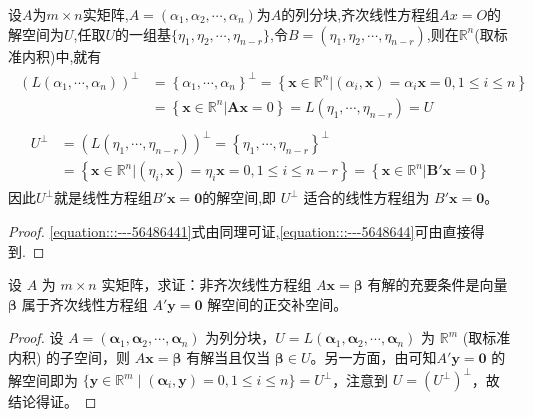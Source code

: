 \documentclass[../../main.tex]{subfiles}
\begin{document}
\begin{corollary}\label{corollary:齐次方程的解空间是其系数矩阵的正交补空间}
设$A$为$m\times n$实矩阵,$A=(\alpha_1,\alpha_2,\cdots,\alpha_n)$为$A$的列分块,齐次线性方程组$Ax=O$的解空间为$U$,任取$U$的一组基$\{\eta_1,\eta_2,\cdots,\eta_{n-r}\}$,令$B=(\eta_1,\eta_2,\cdots,\eta_{n-r})$,则在$\mathbb{R}^n$(取标准内积)中,就有
\begin{align}\label{equation:::---56486441}
\begin{aligned}
\left( L\left( \alpha _1,\cdots ,\alpha _n \right) \right) ^{\bot}&=\left\{ \alpha _1,\cdots ,\alpha _n \right\} ^{\bot}=\left\{ \boldsymbol{x}\in \mathbb{R} ^n|\left( \alpha _i,\boldsymbol{x} \right) =\alpha _i\boldsymbol{x}=0,1\le i\le n \right\} 
\\
&=\left\{ \boldsymbol{x}\in \mathbb{R} ^n|\boldsymbol{Ax}=0 \right\} =L\left( \eta _1,\cdots ,\eta _{n-r} \right) =U
\end{aligned}
\end{align}
\begin{align}\label{equation:::---5648644}
\begin{aligned}
U^{\bot}&=\left( L\left( \eta _1,\cdots ,\eta _{n-r} \right) \right) ^{\bot}=\left\{ \eta _1,\cdots ,\eta _{n-r} \right\} ^{\bot}
\\
&=\left\{ \boldsymbol{x}\in \mathbb{R} ^n|\left( \eta _i,\boldsymbol{x} \right) =\eta _i\boldsymbol{x}=0,1\le i\le n-r \right\} =\left\{ \boldsymbol{x}\in \mathbb{R} ^n|\boldsymbol{B}'\boldsymbol{x}=0 \right\} 
\end{aligned}
\end{align}
因此$U^{\perp}$就是线性方程组$B'\boldsymbol{x} = \boldsymbol{0}$的解空间,即 $U^{\perp}$ 适合的线性方程组为 $B'\boldsymbol{x} = \boldsymbol{0}$。
\end{corollary}
\begin{proof}
\eqref{equation:::---56486441}式由同理可证,\eqref{equation:::---5648644}可由直接得到.

\end{proof}

\begin{proposition}\label{proposition:例9.21}
设 $A$ 为 $m \times n$ 实矩阵，求证：非齐次线性方程组 $A\boldsymbol{x} = \boldsymbol{\beta}$ 有解的充要条件是向量 $\boldsymbol{\beta}$ 属于齐次线性方程组 $A'\boldsymbol{y} = \boldsymbol{0}$ 解空间的正交补空间。
\end{proposition}
\begin{proof}
设 $A = (\boldsymbol{\alpha}_1, \boldsymbol{\alpha}_2, \cdots, \boldsymbol{\alpha}_n)$ 为列分块，$U = L(\boldsymbol{\alpha}_1, \boldsymbol{\alpha}_2, \cdots, \boldsymbol{\alpha}_n)$ 为 $\mathbb{R}^m$ (取标准内积) 的子空间，则 $A\boldsymbol{x} = \boldsymbol{\beta}$ 有解当且仅当 $\boldsymbol{\beta} \in U$。另一方面，由可知$A'\boldsymbol{y} = \boldsymbol{0}$ 的解空间即为 $\{\boldsymbol{y} \in \mathbb{R}^m \mid (\boldsymbol{\alpha}_i, \boldsymbol{y}) = 0, 1 \leqslant  i \leqslant  n\} = U^{\perp}$，注意到 $U = (U^{\perp})^{\perp}$，故结论得证。

\end{proof}
\end{document}
